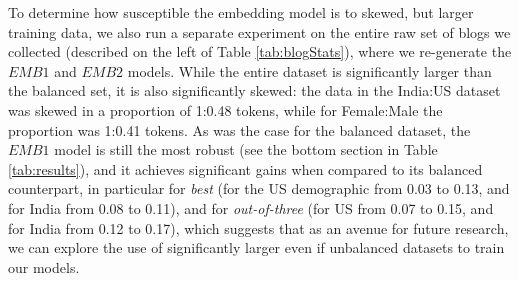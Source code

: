 \documentclass[11pt,letterpaper]{article}
\newcommand{\FIXME}[1]{\textcolor{red}{#1}}
\newcommand{\tabref}[1]{Table~\ref{#1}} %
\begin{document}
To determine how susceptible the embedding model is to skewed, but larger training data, we also run a separate experiment on the entire raw set of blogs we collected (described on the left of Table \ref{tab:blogStats}), where we re-generate the $EMB1$ and $EMB2$ models. While the entire dataset is significantly larger than the balanced set, it is also significantly skewed: 
the data in the India:US dataset was skewed in a proportion of 1:0.48 tokens, while for Female:Male the proportion was 1:0.41 tokens. As was the case for the balanced dataset, the $EMB1$ model is still the most robust (see the bottom section in Table \ref{tab:results}), and it achieves significant gains when compared to its balanced counterpart, in particular for {\it best} (for the US demographic from 0.03 to 0.13, and for India from 0.08 to 0.11), and for {\it out-of-three} (for US from 0.07 to 0.15, and for India from 0.12 to 0.17), which suggests that as an avenue for future research, we can explore the use of significantly larger even if unbalanced datasets to train our models. 










\end{document}
